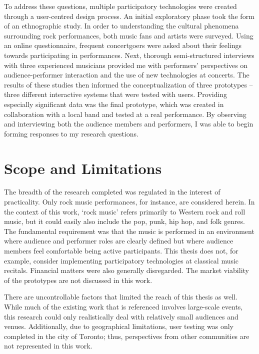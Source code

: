 To address these questions, multiple participatory technologies were created through a user-centred design process. An initial exploratory phase took the form of an ethnographic study. In order to understanding the cultural phenomena surrounding rock performances, both music fans and artists were surveyed. Using an online questionnaire, frequent concertgoers were asked about their feelings towards participating in performances. Next, thorough semi-structured interviews with three experienced musicians provided me with performers' perspectives on audience-performer interaction and the use of new technologies at concerts. The results of these studies then informed the conceptualization of three prototypes -- three different interactive systems that were tested with users. Providing especially significant data was the final prototype, which was created in collaboration with a local band and tested at a real performance. By observing and interviewing both the audience members and performers, I was able to begin forming responses to my research questions.


\section{Scope and Limitations}

The breadth of the research completed was regulated in the interest of practicality. Only rock music performances, for instance, are considered herein. In the context of this work, `rock music' refers primarily to Western rock and roll music, but it could easily also include the pop, punk, hip hop, and folk genres. The fundamental requirement was that the music is performed in an environment where audience and performer roles are clearly defined but where audience members feel comfortable being active participants. This thesis does not, for example, consider implementing participatory technologies at classical music recitals. Financial matters were also generally disregarded. The market viability of the prototypes are not discussed in this work.

There are uncontrollable factors that limited the reach of this thesis as well. While much of the existing work that is referenced involves large-scale events, this research could only realistically deal with relatively small audiences and venues. Additionally, due to geographical limitations, user testing was only completed in the city of Toronto; thus, perspectives from other communities are not represented in this work.

